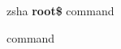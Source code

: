 \documentclass[12pt, a4paper]{article}
\begin{document}
\begin{terminal}{zsh}{a}
{\color{cbf-green} \textbf{root\$}} \color{red}command

command
\end{terminal}
\end{document}
